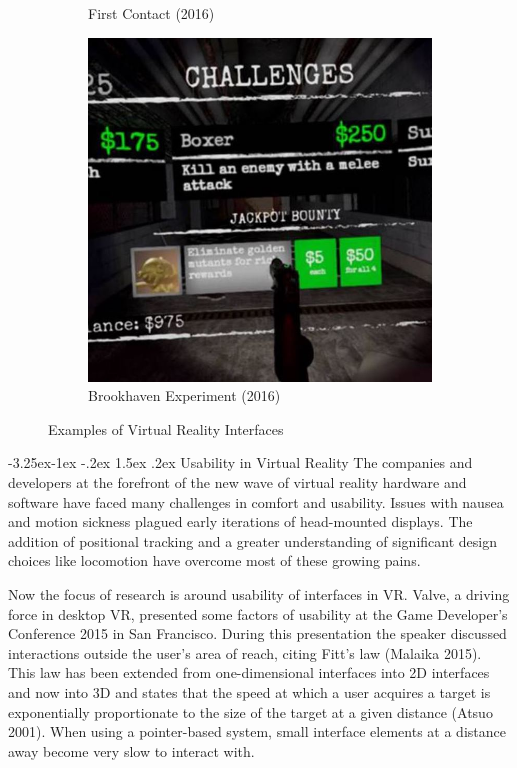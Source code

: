 \documentclass[12pt]{article}
\makeatletter
\renewcommand{\subsection}{\@startsection{subsection}{2}{\z@}%
             {-3.25ex\@plus -1ex \@minus -.2ex}%
             {1.5ex \@plus .2ex}%
             {\normalfont\large\scshape\bfseries}}
\makeatother
\begin{document}
\begin{figure}
\begin{subfigure}{.33\textwidth}
  \caption{First Contact (2016)}
\end{subfigure}%
\begin{subfigure}{.33\textwidth}
  \centering
  \includegraphics[width=.95\linewidth]{brookhaven.jpg}
  \caption{Brookhaven Experiment (2016)}
\end{subfigure}
\caption{Examples of Virtual Reality Interfaces}
\end{figure}

\subsection{Usability in Virtual Reality}
The companies and developers at the forefront of the new wave of virtual reality hardware and software have faced many challenges in comfort and usability. Issues with nausea and motion sickness plagued early iterations of head-mounted displays. The addition of positional tracking and a greater understanding of significant design choices like locomotion have overcome most of these growing pains.

Now the focus of research is around usability of interfaces in VR. Valve, a driving force in desktop VR, presented some factors of usability at the Game Developer's Conference 2015 in San Francisco. During this presentation the speaker discussed interactions outside the user's area of reach, citing Fitt's law (Malaika 2015). This law has been extended from one-dimensional interfaces into 2D interfaces and now into 3D and states that the speed at which a user acquires a target is exponentially proportionate to the size of the target at a given distance (Atsuo 2001). When using a pointer-based system, small interface elements at a distance away become very slow to interact with. 
\end{document}

